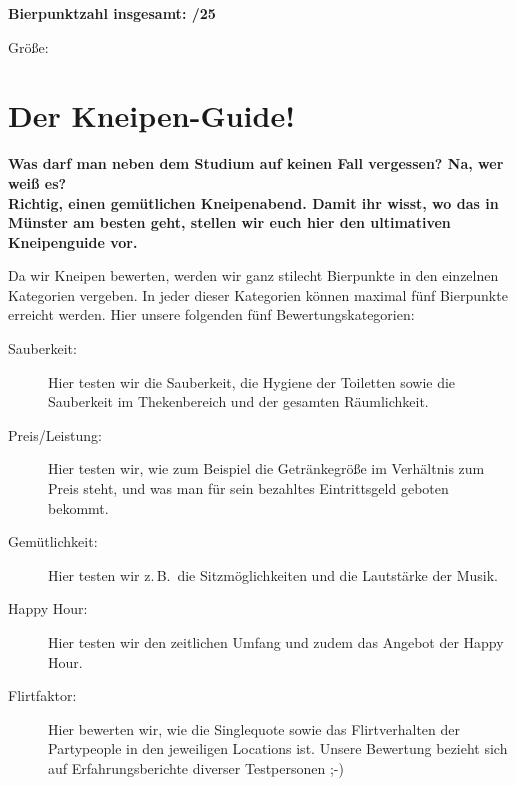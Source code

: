 {{\begin{minipage}{\columnwidth}
		\textbf{Bierpunktzahl insgesamt: /25}
		
		\smallskip
		\raggedright
		\hspace{0.2\columnwidth}
		Größe: \fibelbeerscore{\groesse}
	\end{minipage}
}

\setcounter{fibtemp}{\value{secnumdepth}}
\setcounter{secnumdepth}{\subsectionnumdepth}
\renewcommand{\subsectionformat}{Kneipe \arabic{subsection}: }
\fibelspacingsubsubsection[subsection]

\section{Der Kneipen-Guide!}
\begin{multicols*}{2}
\textbf{Was darf man neben dem Studium auf keinen Fall vergessen?
	Na, wer weiß es?\\
	Richtig, einen gemütlichen Kneipenabend.
	Damit ihr wisst, wo das in Münster am besten geht, stellen wir euch hier den ultimativen Kneipenguide vor.}

Da wir Kneipen bewerten, werden wir ganz stilecht Bierpunkte in den einzelnen Kategorien vergeben.
In jeder dieser Kategorien können maximal fünf Bierpunkte erreicht werden.
Hier unsere folgenden fünf Bewertungskategorien:
\begin{description}
	\item[Sauberkeit:] Hier testen wir die Sauberkeit, die Hygiene der Toiletten sowie die Sauberkeit im Thekenbereich und der gesamten Räumlichkeit.
	\item[Preis/Leistung:] Hier testen wir, wie zum Beispiel die Getränkegröße im Verhältnis zum Preis steht, und was man für sein bezahltes Eintrittsgeld geboten bekommt.
	\item[Gemütlichkeit:] Hier testen wir z.\,B.\ die Sitzmöglichkeiten und die Lautstärke der Musik.
	\item[Happy Hour:] Hier testen wir den zeitlichen Umfang und zudem das Angebot der Happy Hour.
	\item[Flirtfaktor:] Hier bewerten wir, wie die Singlequote sowie das Flirtverhalten der Partypeople in den jeweiligen Locations ist.
	Unsere Bewertung bezieht sich auf Erfahrungsberichte diverser Testpersonen ;-)
\end{description}


\end{multicols*}}
